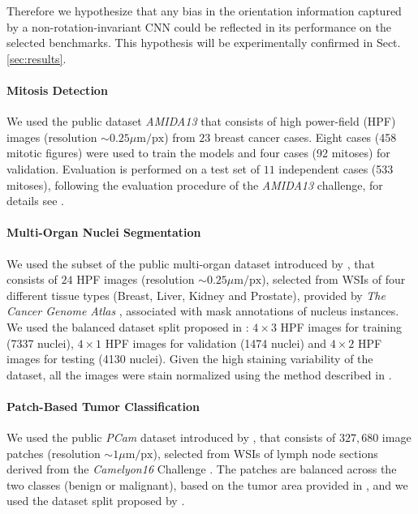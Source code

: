 \documentclass[twocolumn,final]{article}
\begin{document}
Therefore we hypothesize that any bias in the orientation information captured by a non-rotation-invariant CNN could be reflected in its performance on the selected benchmarks.
This hypothesis will be experimentally confirmed in Sect. \ref{sec:results}.

\paragraph{Mitosis Detection}
We used the public dataset \textit{AMIDA13} \citep{veta2015assessment} that consists of high power-field (HPF) images (resolution ${\sim} 0.25{\mu}\text{m}/\text{px}$) from $23$ breast cancer cases.
Eight cases (458 mitotic figures) were used to train the models and four cases (92 mitoses) for validation.
Evaluation is performed on a test set of $11$ independent cases (533 mitoses), following the evaluation procedure of the \textit{AMIDA13} challenge, for details see \citep{veta2015assessment}.

\paragraph{Multi-Organ Nuclei Segmentation}
We used the subset of the public multi-organ dataset introduced by \citep{kumar2017dataset}, that consists of $24$ HPF images (resolution ${\sim}  0.25{\mu}\text{m}/\text{px}$), selected from WSIs of four different tissue types (Breast, Liver, Kidney and Prostate), provided by \textit{The Cancer Genome Atlas} \citep{tcga2012}, associated with mask annotations of nucleus instances.
We used the balanced dataset split proposed in \citep{lafarge2019domain}: $4{\times}3$ HPF images for training (7337 nuclei), $4 {\times} 1$ HPF images for validation (1474 nuclei) and $4 {\times} 2$ HPF images for testing (4130 nuclei).
Given the high staining variability of the dataset, all the images were stain normalized using the method described in \citep{macenko2009method}.

\paragraph{Patch-Based Tumor Classification}
We used the public \textit{PCam} dataset introduced by \citep{veeling2018rotation}, that consists of $327,680$ image patches (resolution ${\sim} 1{\mu}\text{m}/\text{px}$), selected from WSIs of lymph node sections derived from the \textit{Camelyon16} Challenge \citep{bejnordi2017camelyon}.
The patches are balanced 
across the two classes (benign or malignant), based on the tumor area provided in \citep{bejnordi2017camelyon}, and we used the dataset split proposed by \citep{veeling2018rotation}.
\end{document}
